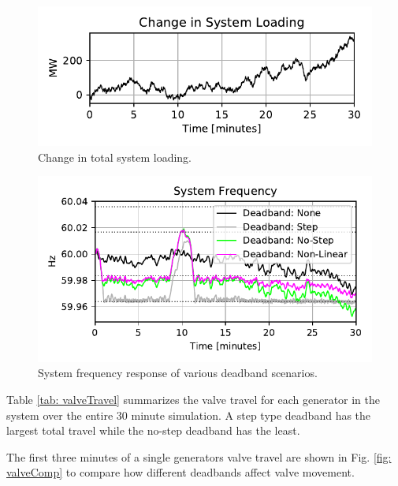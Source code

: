 \begin{figure}[!ht]
\centering
\includegraphics[width=\linewidth]{figures/miniWECCuniAccPloadChange}
\caption{Change in total system loading.}
\label{fig: systemLoading}
\end{figure}%
\begin{figure}[!ht]
\centering
\includegraphics[width=\linewidth]{figures/miniWECCnoiseNLdroopDBFreq}
\caption{System frequency response of various deadband scenarios.}
\label{fig: sysFreqDB}
\end{figure}

Table \ref{tab: valveTravel} summarizes the valve travel for each generator in the system over the entire 30 minute simulation. 
A step type deadband has the largest total travel while the no-step deadband has the least.



The first three minutes of a single generators valve travel are shown in Fig. \ref{fig: valveComp} to compare how different deadbands affect valve movement.

